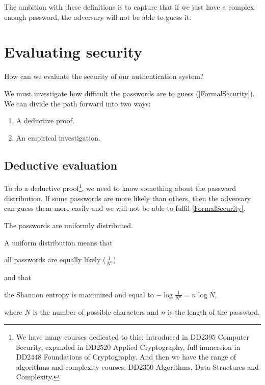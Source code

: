 The ambition with these definitions is to capture that if we just have a 
complex enough password, the adversary will not be able to guess it.


\section{Evaluating security}

\begin{frame}
  \begin{exercise}
    How can we evaluate the security of our authentication system?
  \end{exercise}
\end{frame}

\begin{frame}
  \begin{solution}
    We must investigate how difficult the passwords are to guess 
    (\cref{FormalSecurity}).
    We can divide the path forward into two ways:
    \begin{enumerate}
      \item A deductive proof.
      \item An empirical investigation.
    \end{enumerate}
  \end{solution}
\end{frame}

\subsection{Deductive evaluation}

To do a deductive proof\footnote{%
  We have many courses dedicated to this:
  Introduced in DD2395 Computer Security,
  expanded in DD2520 Applied Cryptography,
  full immersion in DD2448 Foundations of Cryptography.
  And then we have the range of algorithms and complexity courses:
  \eg DD2350 Algorithms, Data Structures and Complexity.
}, we need to know something about the password distribution.
If some passwords are more likely than others, then the adversary can guess 
them more easily and we will not be able to fulfil \cref{FormalSecurity}.

\begin{frame}
  \begin{assumption}\label{AssumeUniform}
    The passwords are uniformly distributed.
  \end{assumption}
\end{frame}

A uniform distribution means that
\begin{frame}
  all passwords are equally likely (\(\frac{1}{N^n}\))
\end{frame}
and that
\begin{frame}
  the Shannon entropy is maximized and equal to \(-\log \frac{1}{N^n} = n \log 
  {N}\),
\end{frame}
where \(N\) is the number of possible characters and \(n\) is the length of the 
password.

